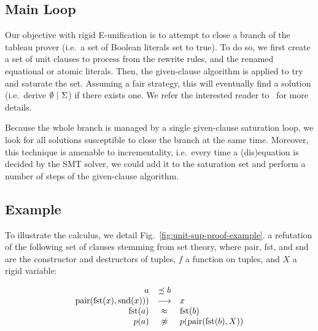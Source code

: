\subsection{Main Loop}

Our objective with rigid E-unification is to attempt to close a branch of the
tableau prover (i.e.~a set of Boolean literals set to true). To do so, we first
create a set of unit clauses to process from the rewrite rules, and the renamed
equational or atomic literals. Then, the given-clause algorithm is applied to
try and saturate the set. Assuming a fair strategy, this will eventually find a
solution (i.e.~derive $\emptyset ~|~ \Sigma$) if there exists
one. We refer the interested reader to~\cite{SS02} for more details.

Because the whole branch is managed by a single given-clause saturation loop, we
look for all solutions susceptible to close the branch at the same time.
Moreover, this technique is amenable to incrementality, i.e.~every time a
(dis)equation is decided by the SMT solver, we could add it to the saturation
set and perform a number of steps of the given-clause algorithm.

\subsection{Example}

To illustrate the calculus, we detail Fig.~\ref{fig:unit-sup-proof-example}.
a refutation of the following set of
clauses stemming from set theory, where pair, fst, and snd are the constructor
and destructors of tuples, $f$ a function on tuples, and $X$ a rigid variable:

\[\begin{array}{rcl}
a &\preceq b \\
\text{pair}(\text{fst}(x), \text{snd}(x))) &\longrightarrow& x\\
\text{fst}(a) &\approx& \text{fst}(b)\\
p(a) &\not\approx& p(\text{pair}(\text{fst}(b), X))\\
\end{array}\]

